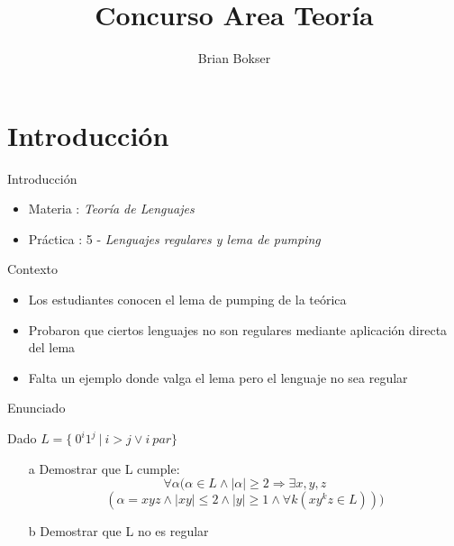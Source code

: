 \documentclass{beamer}
\title{Concurso Area Teoría}
\author{Brian Bokser}
\date{}
\begin{document}
\maketitle

\section{Introducci\'on}

\begin{frame}{Introducción}
    \begin{itemize}
	\item Materia :  \emph{Teoría de Lenguajes}
	\vspace{2em}
      \item Práctica : 5 - \emph{Lenguajes regulares y lema de pumping}

    \end{itemize}

\end{frame}

\begin{frame}{Contexto}
	\begin{itemize}
          \pause
        \item Los estudiantes conocen el lema de pumping de la teórica
          \vspace{2em}
          \pause
      \item Probaron que ciertos lenguajes no son regulares mediante aplicación directa del lema
        \vspace{2em}
        \pause
      \item Falta un ejemplo donde valga el lema pero el lenguaje no sea regular
        \vspace{2em}
	\end{itemize}
\end{frame}


\begin{frame}{Enunciado}
	

Dado $L = \{~0^i1^j ~| ~i>j \lor i~ par\}$

\begin{itemize}
\item[a] Demostrar que L cumple: 
$$ \forall \alpha (\alpha \in L \land |\alpha| \geq 2 \Rightarrow \exists x, y, z $$ 
$$  (\alpha = xyz \land |xy| \leq 2 \land |y| \geq 1 \land \forall k (xy^kz \in L))) $$

\item[b] Demostrar que L no es regular
\end{itemize}


\end{frame}
\end{document}
